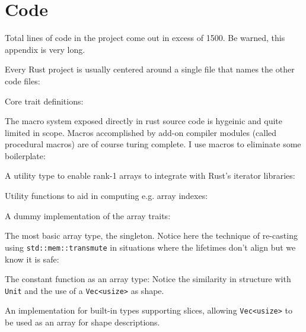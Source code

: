 \documentclass{DIKU-report-variant}
\begin{document}
\section{Code}
\label{sec:apx-code}

Total lines of code in the project come out in excess of 1500. Be warned, this appendix
is very long.

Every Rust project is usually centered around a single file that names the
other code files:


Core trait definitions:


The macro system exposed directly in rust
source code is hygeinic and quite limited in scope. Macros accomplished by add-on compiler modules
(called procedural macros) are of course turing complete.
I use macros to eliminate some boilerplate:


A utility type to enable rank-1 arrays to integrate with Rust's iterator libraries:


Utility functions to aid in computing e.g. array indexes:


A dummy implementation of the array traits:


The most basic array type, the singleton. Notice here the technique of
re-casting using \texttt{std::mem::transmute} in situations where the lifetimes
don't align but we know it is safe:


The constant function as an array type: Notice the similarity in
structure with \texttt{Unit} and the use of a \texttt{Vec<usize>} as shape.


An implementation for built-in types supporting slices, allowing \texttt{Vec<usize>}
to be used as an array for shape descriptions.

\end{document}
